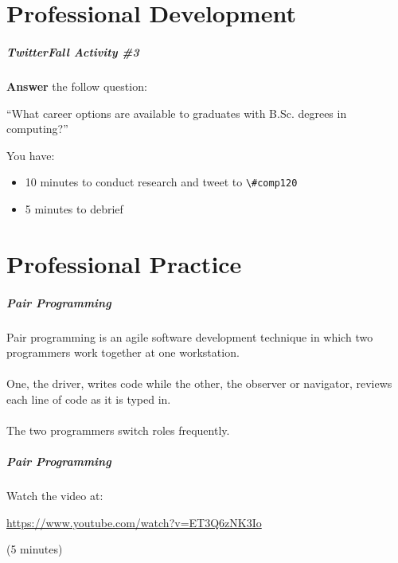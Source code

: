 \part{Professional Development}
\frame{\partpage}

\begin{frame}
	\frametitle{TwitterFall Activity \#3}
	
	\textbf{Answer} the follow question:
	
	\vspace{1em}
	
	``What career options are available to graduates with B.Sc. degrees in computing?''
	
	\vspace{1em}
	
	You have:
	
	\begin{itemize}
		\item 10 minutes to conduct research and tweet to \lstinline{\#comp120}
		\item 5 minutes to debrief
	\end{itemize}
\end{frame}

\part{Professional Practice}
\frame{\partpage}

\begin{frame}
	\frametitle{Pair Programming}
		
	Pair programming is an agile software development technique in which two programmers work together 
	at one workstation. 
	\\~\\
	One, the driver, writes code while the other, the observer or navigator, reviews 
	each line of code as it is typed in. 
	\\~\\
	The two programmers switch roles frequently.
	
\end{frame}

\begin{frame}
	\frametitle{Pair Programming}
	
	Watch the video at:
	
	\vspace{1.5em}
		
	\url{https://www.youtube.com/watch?v=ET3Q6zNK3Io}
	
	\vspace{1em}
		
	(5 minutes)
	
\end{frame}

